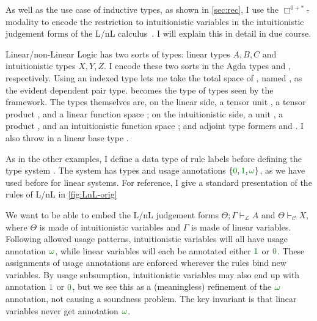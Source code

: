 As well as the use case of inductive types, as shown in \cref{sec:rec}, I use
the $\Box^{0{+}{*}}$-modality to encode the restriction to intuitionistic
variables in the intuitionistic judgement forms of the L/nL
calculus~\citep{Benton94}.
I will explain this in detail in due course.

Linear/non-Linear Logic has two sorts of types: linear types $A, B, C$ and
intuitionistic types $X, Y, Z$.
I encode these two sorts in the Agda types
\AgdaSpace{} and
\AgdaSpace{}, respectively.
Using an indexed type lets me take the total space of , named
, as the evident dependent pair type.
 becomes the type of types seen by the framework.
The types themselves are, on the linear side,
a tensor unit ,
a tensor product , and
a linear function space ;
on the intuitionistic side,
a unit ,
a product , and
an intuitionistic function space ;
and adjoint type formers  and
.
I also throw in a linear base type \AgdaInductiveConstructor{$\iota$}.


As in the other examples, I define a data type of rule labels
 before defining the type system .
The system  has types  and usage
annotations $\{\gr0, \gr1, \gr\omega\}$, as we have used before for linear
systems.
For reference, I give a standard presentation of the rules of L/nL in
\cref{fig:LnL-orig}

We want to be able to embed the L/nL judgement forms
$\Theta; \Gamma \vdash_{\mathcal L} A$ and $\Theta \vdash_{\mathcal C} X$, where
$\Theta$ is made of intuitionistic variables and $\Gamma$ is made of linear
variables.
Following allowed usage patterns, intuitionistic variables will all have usage
annotation $\gr\omega$, while linear variables will each be annotated
either $\gr1$ or $\gr0$.
These assignments of usage annotations are enforced wherever the rules bind new
variables.
By usage subsumption, intuitionistic variables may also end up with annotation
$\gr1$ or $\gr0$, but we see this as a (meaningless) refinement of the
$\gr\omega$ annotation, not causing a soundness problem.
The key invariant is that linear variables never get annotation $\gr\omega$.

